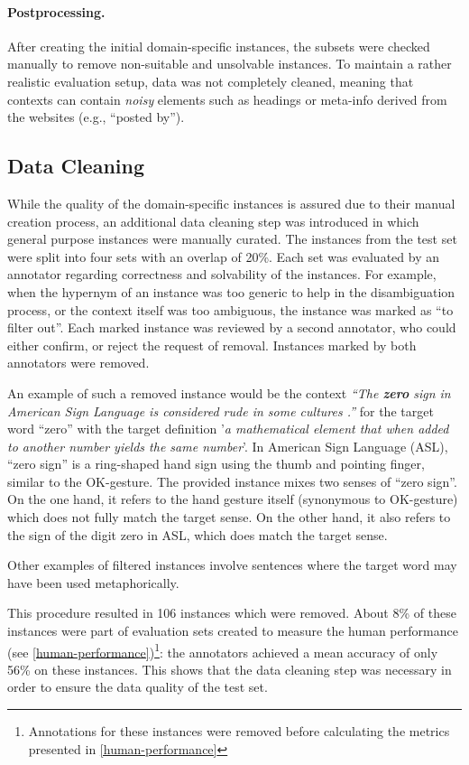 \documentclass[11pt,a4paper]{article}
\begin{document}
\paragraph{Postprocessing.}
After creating the initial domain-specific instances, the subsets were checked manually to remove non-suitable and unsolvable instances. 
To maintain a rather realistic evaluation setup, data was not completely cleaned, meaning that contexts can contain \textit{noisy} elements such as headings or meta-info
derived from the websites (e.g., ``posted by'').

\subsection{Data Cleaning}
\label{data cleaning}
While the quality of the domain-specific instances is assured due to their manual creation process, an additional data cleaning step was introduced in which general purpose instances were manually curated. The instances from the test set were split into four sets with an overlap of 20\%. Each set was evaluated by an annotator regarding correctness and solvability of the instances. For example, when the hypernym of an instance was too generic to help in the disambiguation process, or the context itself was too ambiguous, the instance was marked as ``to filter out''. Each marked instance was reviewed by a second annotator, who could either confirm, or reject the request of removal. Instances marked by both annotators were removed. 

An example of such a removed instance would be the context \textit{``The \textbf{zero} sign in American Sign Language is considered rude in some cultures .''} for the target word ``zero'' with the target definition '\textit{a mathematical element that when added to another number yields the same number}'. 
In American Sign Language (ASL), ``zero sign'' is a ring-shaped hand sign using the thumb and pointing finger, similar to the OK-gesture. 
The provided instance mixes two senses of ``zero sign''. On the one hand, it refers to the hand gesture itself (synonymous to OK-gesture) which does not fully match the target sense. On the other hand, it also refers to the sign of the digit zero in ASL, which does match the target sense.

Other examples of filtered instances involve sentences where the target word may have been used metaphorically.

This procedure resulted in 106 instances which were removed. About 8\% of these instances were part of evaluation sets created to measure the human performance (see \ref{human-performance})\footnote{Annotations for these instances were removed before calculating the metrics presented in \ref{human-performance}}: 
the annotators achieved a mean accuracy of only 56\% on these instances.
This shows that the data cleaning step was necessary in order to ensure the data quality of the test set. 
\end{document}

